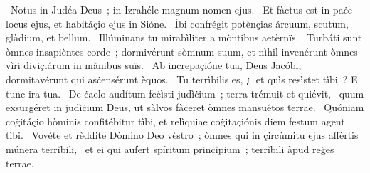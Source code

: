 ~Notus in Judéa Deus~; in Izrahéle magnum nomen ejus. 
~Et fàctus est in paċe locus ejus, et habitáçio ejus in Sióne. 
~Ìbi confrégit potènçias árcuum, scutum, glàdium, et bellum. 
~Illúminans tu mirabìliter a mòntibus aetèrnïs. 
~Turbáti sunt òmnes insapièntes corde~; dormivérunt sòmnum suum, et nìhil invenérunt òmnes vìri diviçiárum in mànibus suïs. 
~Ab increpaçióne tua, Deus Jacóbi, dormitavérunt qui asċensérunt èquos. 
~Tu terrìbilis es, ¿~et quìs resìstet tìbi~? E tunc ira tua. 
~De ċaelo audítum feċìsti judìċium~; terra trémuit et quiévit, 
~quum exsurgéret in judìċium Deus, ut sàlvos fàċeret òmnes mansuétos terrae. 
~Quóniam coġitáçio hòminis confitébitur tìbi, et relìquiae coġitaçiónis diem festum agent tìbi. 
~Vovéte et rèddite Dòmino Deo vèstro~; òmnes qui in çircùmitu ejus affèrtis múnera terrìbili, 
~et ei qui aufert spíritum prinċìpium~; terrìbili àpud reġes terrae. 

